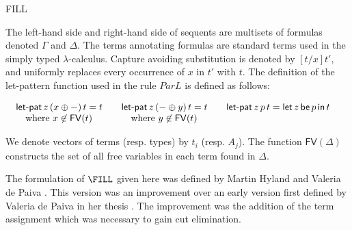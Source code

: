 \begin{entry}{FILL}

\begin{clarifications}
The left-hand side and right-hand side of sequents are multisets of
formulas denoted $\Gamma$ and $\Delta$.  The terms annotating formulas
are standard terms used in the simply typed $\lambda$-calculus.
Capture avoiding substitution is denoted by $[t/x]t'$, and
uniformly replaces every occurrence of $x$ in $t'$ with $t$.  The
definition of the let-pattern function used in the rule $ParL$ is
defined as follows:
\begin{center}
    \begin{math}
      \begin{array}{lll}      
        \begin{array}{lll}
          \mathsf{let}\mbox{-}\mathsf{pat}\,z\,(x \oplus -)\,t = t\\
          \,\,\,\,\,\,\mbox{where } x \not\in \mathsf{FV}(t)\\
        \end{array}
        & 
          \begin{array}{lll}
            \mathsf{let}\mbox{-}\mathsf{pat}\,z\,(- \oplus y)\,t = t\\
        \,\,\,\,\,\,\mbox{where } y \not\in \mathsf{FV}(t)\\
          \end{array}
        & 
          \begin{array}{lll}
            \mathsf{let}\mbox{-}\mathsf{pat}\,z\,p\,t = \mathsf{let}\,z\,\mathsf{be}\,p\,\mathsf{in}\,t\\
            & \\
          \end{array}
      \end{array}
    \end{math}
\end{center}
We denote vectors of terms (resp. types) by $t_i$ (resp. $A_j$).  The
function $\mathsf{FV}(\Delta)$ constructs the set of all free
variables in each term found in $\Delta$.
\end{clarifications}

\begin{history}
  The formulation of $\FILL$ given here was defined by Martin Hyland
  and Valeria de Paiva \cite{Hyland:1993}.  This version was an
  improvement over an early version first defined by Valeria de Paiva
  in her thesis \cite{dePaiva:1990}.  The improvement was the addition
  of the term assignment which was necessary to gain cut elimination.
\end{history}


\end{entry}
